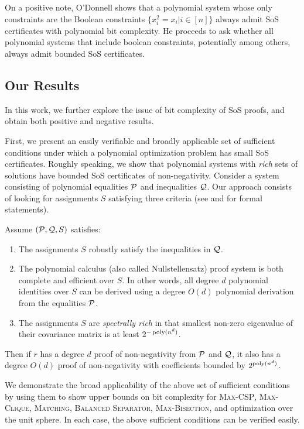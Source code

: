 On a positive note, O'Donnell shows that a polynomial system whose only constraints are the Boolean constraints $\{x_i^2 = x_i | i \in [n]\}$ always admit SoS certificates with polynomial bit complexity.  
%
He proceeds to ask whether all polynomial systems that include boolean constraints, potentially among others, always admit bounded SoS certificates.


\subsection{Our Results}

In this work, we further explore the issue of bit complexity of SoS proofs, and obtain both positive and negative results.
%

First, we present an easily verifiable and broadly applicable set of sufficient conditions under which a polynomial optimization problem has small SoS certificates.
%
Roughly speaking, we show that polynomial systems with {\it rich} sets of solutions have bounded SoS certificates of non-negativity.
%
Consider a system consisting of polynomial equalities $\mathcal P$ and inequalities $\mathcal Q$.  Our approach consists of looking for assignments $S$ satisfying three criteria (see  and  for formal statements).  
\begin{theorem}
Assume $(\mathcal P, \mathcal Q, S)$ satisfies:
\begin{enumerate}
\item The assignments $S$ robustly satisfy the inequalities in $\mathcal Q$.  
\item The polynomial calculus (also called Nullstellensatz) proof system is both complete and efficient over $S$.  In other words, all degree $d$ polynomial identities over $S$ can be derived using a degree $O(d)$ polynomial derivation from the equalities $\mathcal P$.
\item The assignments $S$ are {\it spectrally rich} in that smallest non-zero eigenvalue of their covariance matrix is at least $2^{-\operatorname{poly}(n^d)}$. 
\end{enumerate}
Then if $r$ has a degree $d$ proof of non-negativity from $\mathcal P$ and $\mathcal Q$, it also has a degree $O(d)$ proof of non-negativity with coefficients bounded by $2^{\operatorname{poly}(n^d)}$.
\end{theorem}

We demonstrate the broad applicability of the above set of sufficient conditions by using them to show upper bounds on bit complexity for \textsc{Max-CSP}, \textsc{Max-Clique}, \textsc{Matching}, \textsc{Balanced Separator}, \textsc{Max-Bisection}, and optimization over the unit sphere.  In each case, the above sufficient conditions can be verified easily. 
%

